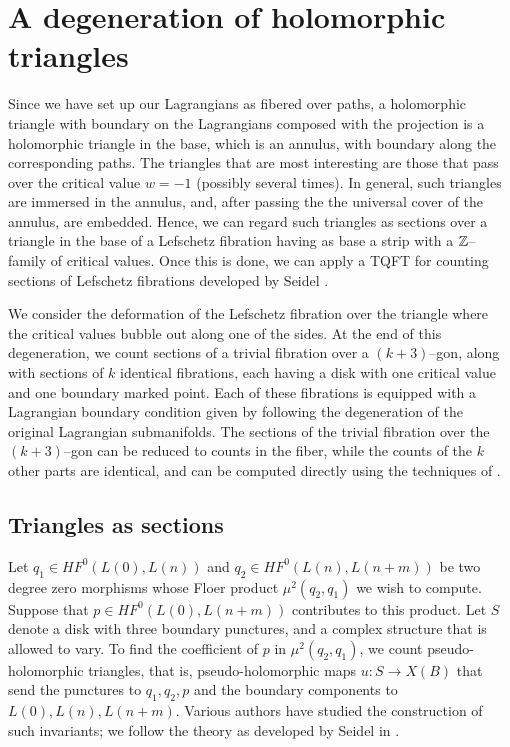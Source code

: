 \documentclass[12pt]{amsart}
\begin{document}
\section{A degeneration of holomorphic triangles}
\label{sec:degeneration}

Since we have set up our Lagrangians as fibered over paths, a
holomorphic triangle with boundary on the Lagrangians composed with
the projection is a holomorphic triangle in the base, which is an
annulus, with boundary along the corresponding paths. The triangles
that are most interesting are those that pass over the critical value
$w = -1$ (possibly several times). In general, such triangles are
immersed in the annulus, and, after passing the the universal cover of
the annulus, are embedded. Hence, we can regard such triangles as
sections over a triangle in the base of a Lefschetz fibration having
as base a strip with a $\mathbb{Z}$--family of critical values. Once this is
done, we can apply a TQFT for counting sections of Lefschetz
fibrations developed by Seidel \cite{seidel-book,seidel-les}.

We consider the deformation of the Lefschetz fibration over the
triangle where the critical values bubble out along one of the
sides. At the end of this degeneration, we count sections of a trivial
fibration over a $(k+3)$--gon, along with sections of $k$ identical
fibrations, each having a disk with one critical value and one
boundary marked point. Each of these fibrations is equipped with a
Lagrangian boundary condition given by following the degeneration of
the original Lagrangian submanifolds. The sections of the trivial
fibration over the $(k+3)$--gon can be reduced to counts in the
fiber, while the counts of the $k$ other parts are identical, and can
be computed directly using the techniques of \cite{seidel-les}.

\subsection{Triangles as sections}
\label{sec:triangles-sections}

Let $q_1 \in HF^0(L(0),L(n))$ and $q_2 \in HF^0(L(n),L(n+m))$ be two
degree zero morphisms whose Floer product $\mu^2(q_2,q_1)$ we wish to
compute. Suppose that $p \in HF^0(L(0),L(n+m))$ contributes to this
product. Let $S$ denote a disk with three boundary punctures, and a
complex structure that is allowed to vary. To find the coefficient of
$p$ in $\mu^2(q_2,q_1)$, we count pseudo-holomorphic triangles, that
is, pseudo-holomorphic maps $u: S \to X(B)$ that send the punctures to
$q_1,q_2,p$ and the boundary components to $L(0),L(n),L(n+m)$. Various authors have studied the construction of such invariants; we follow the theory as developed by Seidel in \cite{seidel-book,seidel-les}.
\end{document}
